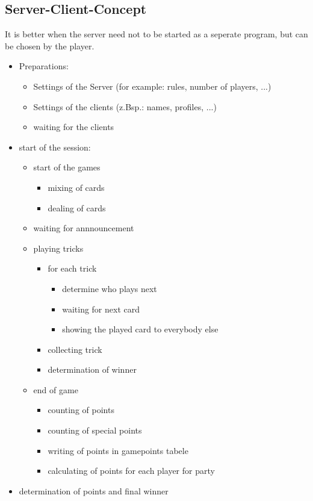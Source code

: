 \documentclass[12pt,a4paper]{article}
\begin{document}
\subsection{Server-Client-Concept}
It is better when the server need not to be started as a seperate program, but can be chosen by the player.
\begin{itemize}
\item Preparations:
\begin{itemize}
\item Settings of the Server (for example: rules, number of players, ...)
\item Settings of the clients (z.Bsp.: names, profiles, ...)
\item waiting for the clients
\end{itemize}
\item start of the session:
\begin{itemize}
\item start of the games
\begin{itemize}
\item mixing of cards
\item dealing of cards
\end{itemize}
\item waiting for annnouncement
\item playing tricks
\begin{itemize}
\item for each trick
\begin{itemize}
\item determine who plays next
\item waiting for next card
\item showing the played card to everybody else
\end{itemize}
\item collecting trick
\item determination of winner
\end{itemize}
\item end of game
\begin{itemize}
\item counting of points
\item counting of special points
\item writing of points in gamepoints tabele
\item calculating of points for each player for party
\end{itemize}
\end{itemize}
\item determination of points and final winner
\end{itemize}
\end{document}
